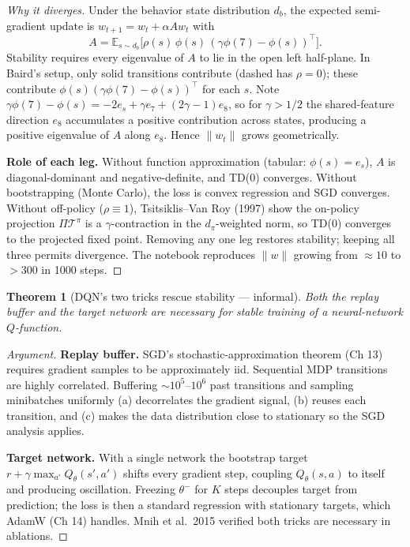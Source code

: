 \documentclass[11pt]{article}
\newtheorem{theorem}{Theorem}[section]
\theoremstyle{remark}
\begin{document}
\begin{proof}[Why it diverges]
Under the behavior state distribution $d_b$, the expected semi-gradient update is $w_{t+1}=w_t+\alpha A w_t$ with
\[
A=\mathbb{E}_{s\sim d_b}\!\big[\rho(s)\,\phi(s)\,(\gamma\phi(7)-\phi(s))^\top\big].
\]
Stability requires every eigenvalue of $A$ to lie in the open left half-plane. In Baird's setup, only solid transitions contribute (dashed has $\rho=0$); these contribute $\phi(s)(\gamma\phi(7)-\phi(s))^\top$ for each $s$. Note $\gamma\phi(7)-\phi(s)=-2e_s+\gamma e_7+(2\gamma-1)e_8$, so for $\gamma>1/2$ the shared-feature direction $e_8$ accumulates a positive contribution across states, producing a positive eigenvalue of $A$ along $e_8$. Hence $\|w_t\|$ grows geometrically.

\textbf{Role of each leg.} Without function approximation (tabular: $\phi(s)=e_s$), $A$ is diagonal-dominant and negative-definite, and TD(0) converges. Without bootstrapping (Monte Carlo), the loss is convex regression and SGD converges. Without off-policy ($\rho\equiv 1$), Tsitsiklis--Van Roy (1997) show the on-policy projection $\Pi\mathcal{T}^\pi$ is a $\gamma$-contraction in the $d_\pi$-weighted norm, so TD(0) converges to the projected fixed point. Removing any one leg restores stability; keeping all three permits divergence. The notebook reproduces $\|w\|$ growing from $\approx 10$ to $>300$ in 1000 steps.
\end{proof}

\begin{theorem}[DQN's two tricks rescue stability --- informal]
Both the replay buffer and the target network are necessary for stable training of a neural-network $Q$-function.
\end{theorem}

\begin{proof}[Argument]
\textbf{Replay buffer.} SGD's stochastic-approximation theorem (Ch 13) requires gradient samples to be approximately iid. Sequential MDP transitions are highly correlated. Buffering $\sim 10^5$--$10^6$ past transitions and sampling minibatches uniformly (a) decorrelates the gradient signal, (b) reuses each transition, and (c) makes the data distribution close to stationary so the SGD analysis applies.

\textbf{Target network.} With a single network the bootstrap target $r+\gamma\max_{a'}Q_\theta(s',a')$ shifts every gradient step, coupling $Q_\theta(s,a)$ to itself and producing oscillation. Freezing $\theta^-$ for $K$ steps decouples target from prediction; the loss is then a standard regression with stationary targets, which AdamW (Ch 14) handles. Mnih et al.\ 2015 verified both tricks are necessary in ablations.
\end{proof}
\end{document}
